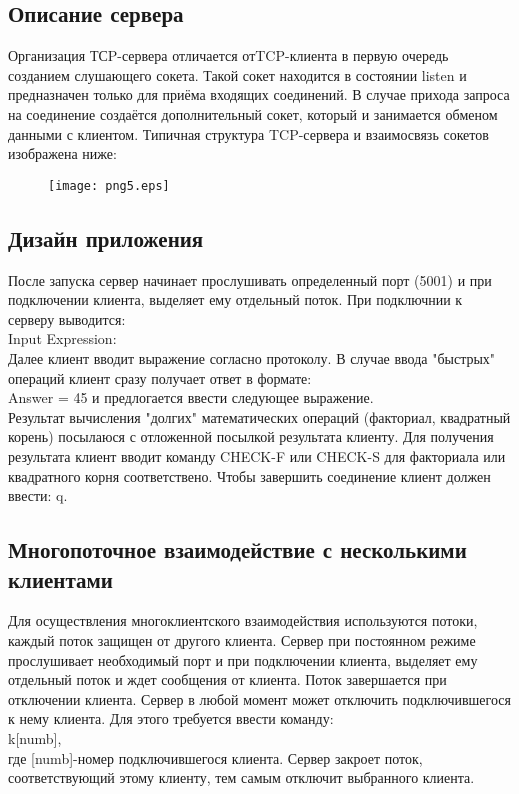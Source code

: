 \documentclass[12pt,a4paper]{report}
\begin{document}
\subsection{Описание сервера}
Организация ТСP-сервера отличается отTCP-клиента в первую очередь
созданием  слушающего сокета. Такой сокет находится в состоянии listen  и  предназначен  только  для  приёма  входящих  соединений.  В случае  прихода  запроса  на  соединение  создаётся  дополнительный  сокет,  который  и  занимается  обменом  данными  с  клиентом.  Типичная  структура TCP-сервера и взаимосвязь сокетов изображена ниже:\\
\begin{figure}[htb]
\centering
\texttt{[image: png5.eps]}
\end{figure}

\subsection{Дизайн приложения}
После запуска сервер начинает прослушивать определенный порт (5001) и при подключении клиента, выделяет ему отдельный поток. При подключнии к серверу выводится:\\
Input Expression:\\
Далее клиент вводит выражение согласно протоколу. В случае ввода "быстрых" операций 
клиент сразу получает ответ в формате:\\
Answer = 45 и предлогается ввести следующее выражение.\\
Результат вычисления "долгих" математических  операций (факториал,  квадратный  корень) посылаюся с  отложенной  посылкой  результата клиенту.
Для получения результата клиент вводит
команду CHECK-F или CHECK-S для факториала или квадратного корня соответствено.
Чтобы завершить соединение клиент должен ввести: q.
\subsection{Многопоточное взаимодействие с несколькими клиентами}
Для осуществления многоклиентского взаимодействия используются потоки, каждый поток защищен от другого клиента. Сервер при постоянном режиме прослушивает необходимый порт и при подключении клиента, выделяет ему отдельный поток и ждет сообщения от клиента. Поток завершается при отключении клиента.
Сервер в любой момент может отключить подключившегося к нему клиента. Для этого требуется ввести команду:\\
k[numb],\\
где [numb]-номер подключившегося клиента.
Сервер закроет поток, соответствующий этому клиенту, тем самым отключит выбранного клиента.
\end{document}
